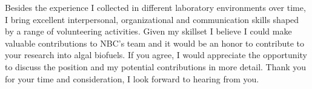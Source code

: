 \documentclass[11pt,a4paper,sans]{moderncv}
\begin{document}
\begin{spacing}{1.15}
Besides the experience I collected in different laboratory environments over time, I bring excellent interpersonal, organizational and communication skills shaped by a range of volunteering activities. %
Given my skillset I believe I could make valuable contributions to NBC's team and it would be an honor to contribute to your research into algal biofuels. %
If you agree, I would appreciate the opportunity to discuss the position and my potential contributions in more detail.  %
Thank you for your time and consideration, I look forward to hearing from you. %
%  

\end{spacing}
\makeletterclosing
\end{document}
